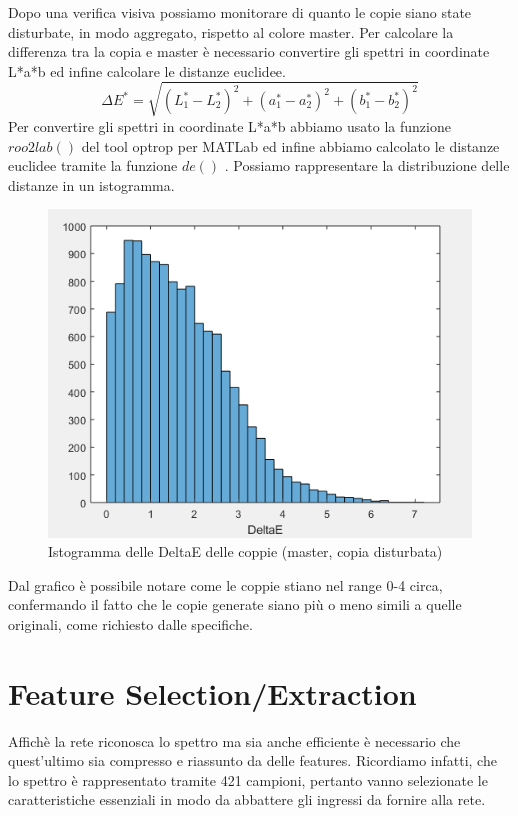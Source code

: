 Dopo una verifica visiva possiamo monitorare di quanto le copie siano state disturbate, in modo aggregato, rispetto al colore master. Per calcolare la differenza tra la copia e master è necessario convertire gli spettri in coordinate L*a*b ed infine calcolare le distanze euclidee. 
\begin{equation}\label{eqn:formula}
        \Delta E^* = \sqrt{(L_1^*-L_2^*)^2+(a_1^*-a_2^*)^2+(b_1^*-b_2^*)^2}
\end{equation}
Per convertire gli spettri in coordinate L*a*b abbiamo usato la funzione \(roo2lab()\) del tool optrop per MATLab ed infine abbiamo calcolato le distanze euclidee tramite la funzione \(de()\) . Possiamo rappresentare la distribuzione delle distanze in un istogramma.

\begin{figure}
\begin{center}
	\includegraphics[scale=0.8]{images/rete1-istogramma-deltae.PNG}
\end{center}
\caption{Istogramma delle DeltaE delle coppie (master, copia disturbata)}
\end{figure}

Dal grafico è possibile notare come le coppie stiano nel range 0-4 circa, confermando il fatto che le copie generate siano più o meno simili a quelle originali, come richiesto dalle specifiche.

\section{Feature Selection/Extraction}
Affichè la rete riconosca lo spettro ma sia anche efficiente è necessario che quest'ultimo sia compresso e riassunto da delle features. Ricordiamo infatti, che lo spettro è rappresentato tramite 421 campioni, pertanto vanno selezionate le caratteristiche essenziali in modo da abbattere gli ingressi da fornire alla rete.

